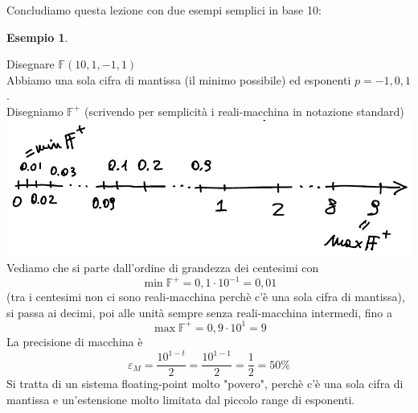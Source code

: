 \documentclass[12pt]{article}
\newtheorem*{esempio}{Esempio}
\begin{document}
Concludiamo questa lezione con due esempi semplici in base 10:
\begin{esempio} \end{esempio}
Disegnare $\mathbb{F}(10, 1, -1, 1)$ \\
Abbiamo una sola cifra di mantissa (il minimo possibile) ed esponenti $p = -1, 0, 1$.\\
Disegniamo $\mathbb{F}^+$ (scrivendo per semplicità i reali-macchina in notazione standard) \newline
\includegraphics[width=\linewidth]{img10}
Vediamo che si parte dall'ordine di grandezza dei centesimi con 
\[ \min \mathbb{F}^+ = 0,1 \cdot 10^{-1} = 0,01 \]
(tra i centesimi non ci sono reali-macchina perchè c'è una sola cifra di mantissa), si passa ai decimi, poi alle unità sempre senza reali-macchina intermedi, fino a
\[ \max \mathbb{F}^+ = 0,9 \cdot 10^1 = 9 \]
La precisione di macchina è 
\[ \varepsilon_M = \frac{10^{1-t}}{2} = \frac{10^{1-1}}{2} = \frac{1}{2} = 50\% \]
Si tratta di un sistema floating-point molto "povero", perchè c'è una sola cifra di mantissa e un'estensione molto limitata dal piccolo range di esponenti.
\end{document}
